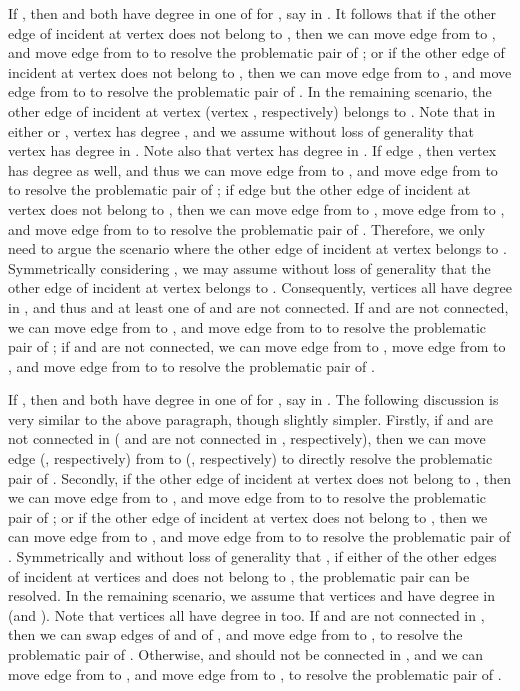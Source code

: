 \documentclass[11pt,twoside]{article}\usepackage{amssymb,latexsym,graphicx,hyperref}\usepackage{epstopdf}
\newenvironment{proof}{{\sc Proof. }}{\hfill\vspace{0.2in}}
\begin{document}
\begin{proof}
If , then  and  both have degree  in one of  for , say in .
It follows that if the other edge of  incident at vertex  does not belong to ,
then we can move edge  from  to , and move edge  from  to  to resolve the problematic pair of ;
or if the other edge of  incident at vertex  does not belong to ,
then we can move edge  from  to , and move edge  from  to  to resolve the problematic pair of .
In the remaining scenario, the other edge of  incident at vertex  (vertex , respectively) belongs to .
Note that in either  or , vertex  has degree ,
and we assume without loss of generality that vertex  has degree  in .
Note also that vertex  has degree  in .
If edge , then vertex  has degree  as well, and thus
we can move edge  from  to , and move edge  from  to  to resolve the problematic pair of ;
if edge  but the other edge of  incident at vertex  does not belong to ,
then we can move edge  from  to , move edge  from  to ,
and move edge  from  to  to resolve the problematic pair of .
Therefore, we only need to argue the scenario where the other edge of  incident at vertex  belongs to .
Symmetrically considering , we may assume without loss of generality that the other edge of  incident at vertex  belongs to .
Consequently, vertices  all have degree  in , and thus  and at least one of  and  are not connected.
If  and  are not connected, we can move edge  from  to ,
and move edge  from  to  to resolve the problematic pair of ;
if  and  are not connected, we can move edge  from  to , move edge  from  to ,
and move edge  from  to  to resolve the problematic pair of .


If , then  and  both have degree  in one of  for , say in .
The following discussion is very similar to the above paragraph, though slightly simpler.
Firstly, if  and  are not connected in  ( and  are not connected in , respectively),
then we can move edge  (, respectively) from  to  (, respectively)
to directly resolve the problematic pair of .
Secondly, if the other edge of  incident at vertex  does not belong to ,
then we can move edge  from  to , and move edge  from  to  to resolve the problematic pair of ;
or if the other edge of  incident at vertex  does not belong to ,
then we can move edge  from  to , and move edge  from  to  to resolve the problematic pair of .
Symmetrically and without loss of generality that ,
if either of the other edges of  incident at vertices  and  does not belong to , the problematic pair can be resolved.
In the remaining scenario, we assume that vertices  and  have degree  in  (and ).
Note that vertices  all have degree  in  too.
If  and  are not connected in , then we can swap edges of  and of ,
and move edge  from  to , to resolve the problematic pair of .
Otherwise,  and  should not be connected in ,
and we can move edge  from  to , and move edge  from  to ,
to resolve the problematic pair of .



\end{proof}
\end{document}
